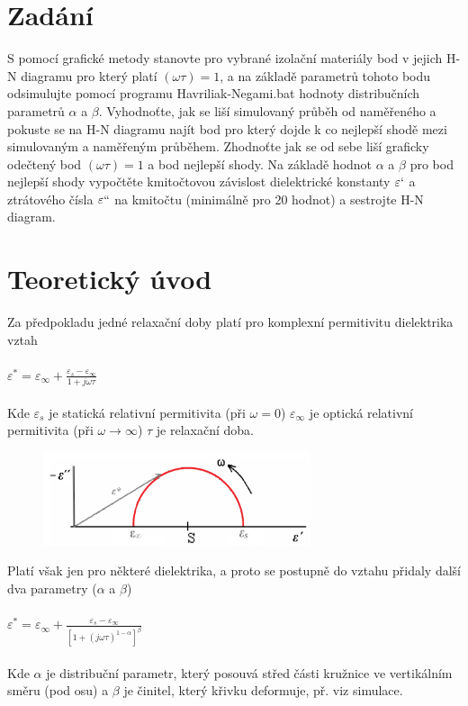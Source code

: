 \documentclass{article}
\begin{document}


\section*{Zadání}
S pomocí grafické metody stanovte pro vybrané izolační materiály bod v jejich H-N diagramu
pro který platí \((\omega \tau) = 1\), a na základě parametrů tohoto bodu odsimulujte pomocí programu
Havriliak-Negami.bat hodnoty distribučních parametrů \(\alpha\) a \(\beta\).
Vyhodnoťte, jak se liší simulovaný průběh od naměřeného a pokuste se na H-N diagramu najít
bod pro který dojde k co nejlepší shodě mezi simulovaným a naměřeným průběhem. Zhodnoťte
jak se od sebe liší graficky odečtený bod \((\omega \tau) = 1\) a bod nejlepší shody.
Na základě hodnot \(\alpha\) a \(\beta\) pro bod nejlepší shody vypočtěte kmitočtovou závislost dielektrické
konstanty \(\varepsilon`\) a ztrátového čísla \(\varepsilon``\) na kmitočtu (minimálně pro 20 hodnot) a sestrojte H-N
diagram.

\section*{Teoretický úvod}
Za předpokladu jedné relaxační doby platí pro komplexní permitivitu dielektrika vztah \\
\\
\Large
\(
    \varepsilon^* = \varepsilon_\infty + \frac{\varepsilon_s - \varepsilon_\infty}{1 + j \omega \tau} 
\)
\\
\\
\normalsize
Kde \(\varepsilon_s\) je statická relativní permitivita (při \(\omega = 0\)) \(\varepsilon_\infty\) je optická relativní permitivita (při \(\omega \rightarrow \infty \)) \(\tau\) je relaxační doba.
\begin{figure}[H]
    \centering
    \includegraphics[width=0.7\textwidth]{obrazky/teorie1.png}
\end{figure}
Platí však jen pro některé dielektrika, a proto se postupně do vztahu přidaly další dva parametry (\(\alpha\) a \(\beta\))\\
\\
\Large
\(
    \varepsilon^* = \varepsilon_\infty + \frac{\varepsilon_s - \varepsilon_\infty}{\left[1 + (j \omega \tau)^{1-\alpha}\right]^{\beta}} 
\)
\\
\\
\normalsize
Kde \(\alpha\) je distribuční parametr, který posouvá střed části kružnice ve vertikálním směru (pod osu) a \(\beta\) je činitel, který křivku deformuje, př. viz simulace.
\end{document}
